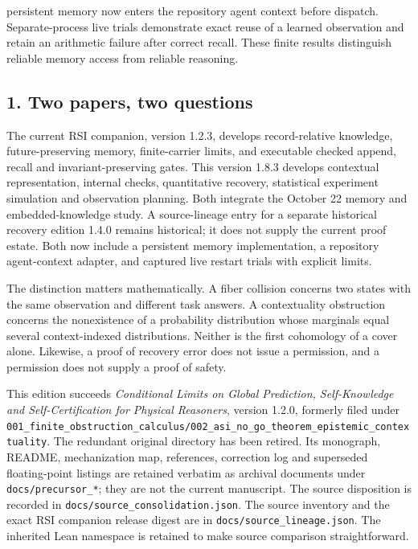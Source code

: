 \documentclass[
  10pt,
]{article}
\begin{document}
persistent memory now enters the repository agent context before dispatch. Separate-process live trials demonstrate exact reuse of a learned observation and retain an arithmetic failure after correct recall. These finite results distinguish reliable memory access from reliable reasoning.

\subsection{1. Two papers, two questions}\label{two-papers-two-questions}

The current RSI companion, version 1.2.3, develops record-relative knowledge, future-preserving memory, finite-carrier limits, and executable checked append, recall and invariant-preserving gates. This version 1.8.3 develops contextual representation, internal checks, quantitative recovery, statistical experiment simulation and observation planning. Both integrate the October 22 memory and embedded-knowledge study. A source-lineage entry for a separate historical recovery edition 1.4.0 remains historical; it does not supply the current proof estate. Both now include a persistent memory implementation, a repository agent-context adapter, and captured live restart trials with explicit limits.

The distinction matters mathematically. A fiber collision concerns two states with the same observation and different task answers. A contextuality obstruction concerns the nonexistence of a probability distribution whose marginals equal several context-indexed distributions. Neither is the first cohomology of a cover alone. Likewise, a proof of recovery error does not issue a permission, and a permission does not supply a proof of safety.

This edition succeeds \emph{Conditional Limits on Global Prediction, Self-Knowledge and Self-Certification for Physical Reasoners}, version 1.2.0, formerly filed under \texttt{001\_finite\_obstruction\_calculus/002\_asi\_no\_go\_theorem\_epistemic\_contextuality}. The redundant original directory has been retired. Its monograph, README, mechanization map, references, correction log and superseded floating-point listings are retained verbatim as archival documents under \texttt{docs/precursor\_*}; they are not the current manuscript. The source disposition is recorded in \texttt{docs/source\_consolidation.json}. The source inventory and the exact RSI companion release digest are in \texttt{docs/source\_lineage.json}. The inherited Lean namespace is retained to make source comparison straightforward.
\end{document}
